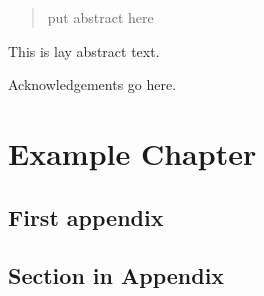 \begin{abstract} %

put abstract here
  
  \lipsum[1-2]
\end{abstract}%
\clearpage



\begin{uomlay} %
  This is lay abstract text. 
  
  \lipsum[1-2]
\end{uomlay}



\uomdeclarations %






\begin{uomacknowledgements} %
Acknowledgements go here.
\end{uomacknowledgements}

\chapter{Example Chapter}\label{chap:example_chapter}



\printbibliography[title={References},heading=bibintoc] %



\begin{uomappendix} 
  \chapter{First appendix}
    \section{Section in Appendix}
    \lipsum[1-6]
\end{uomappendix}


